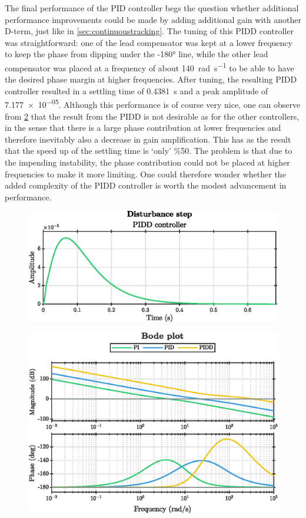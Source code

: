 The final performance of the PID controller begs the question whether additional performance improvements could be made by adding additional gain with another D-term, just like in \cref{sec:continuoustracking}. The tuning of this PIDD controller was straightforward: one of the lead compensator was kept at a lower frequency to keep the phase from dipping under the \ang{-180} line, while the other lead compensator was placed at a frequency of about \SI{140}{\radian\per\second} to be able to have the desired phase margin at higher frequencies. After tuning, the resulting PIDD controller resulted in a settling time of \SI{0.4381}{\second} and a peak amplitude of \num{7.177e-05}. Although this performance is of course very nice, one can observe from \cref{fig:q2_bode_comparison} that the result from the PIDD is not desirable as for the other controllers, in the sense that there is a large phase contribution at lower frequencies and therefore inevitably also a decrease in gain amplification. This has as the result that the speed up of the settling time is `only' \%50. The problem is that due to the impending instability, the phase contribution could not be placed at higher frequencies to make it more limiting. One could therefore wonder whether the added complexity of the PIDD controller is worth the modest advancement in performance.
\begin{figure}[ht]
    \centering
    \includegraphics[]{media/q2/pidd_response.eps}
    \caption{}
    \label{fig:q2_pidd_response}
\end{figure}
\begin{figure}[ht]
    \centering
    \includegraphics[]{media/q2/pi_bode_comparison.eps}
    \caption{}
    \label{fig:q2_bode_comparison}
\end{figure}